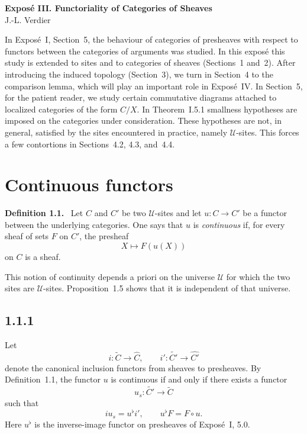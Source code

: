 \documentclass[11pt]{article}
\newcommand{\U}{\mathcal{U}}
\newenvironment{statement}[1]{\par\medskip\noindent\textbf{#1.}\ }{\par\medskip}
\begin{document}
\begin{center}
{\Large \textbf{Expos\'e III. Functoriality of Categories of Sheaves}}\\[0.35em]
J.-L. Verdier
\end{center}

\bigskip


\bigskip

In Expos\'e~I, Section~5, the behaviour of categories of presheaves with respect to functors between the categories of arguments was studied. In this expos\'e this study is extended to sites and to categories of sheaves (Sections~1 and~2). After introducing the induced topology (Section~3), we turn in Section~4 to the comparison lemma, which will play an important role in Expos\'e~IV. In Section~5, for the patient reader, we study certain commutative diagrams attached to localized categories of the form \(C/X\). In Theorem~I.5.1 smallness hypotheses are imposed on the categories under consideration. These hypotheses are not, in general, satisfied by the sites encountered in practice, namely \(\U\)-sites. This forces a few contortions in Sections~4.2, 4.3, and~4.4.

\section{Continuous functors}

\begin{statement}{Definition 1.1}
Let \(C\) and \(C'\) be two \(\U\)-sites and let
\(u:C\to C'\) be a functor between the underlying categories. One says that \(u\) is \emph{continuous} if, for every sheaf of sets \(F\) on \(C'\), the presheaf
\[
X\longmapsto F(u(X))
\]
on \(C\) is a sheaf.
\end{statement}

This notion of continuity depends a priori on the universe \(\U\) for which the two sites are \(\U\)-sites. Proposition~1.5 shows that it is independent of that universe.

\subsection*{1.1.1}
Let
\[
i:\widetilde C\to \widehat C,
\qquad
 i':\widetilde{C'}\to \widehat{C'}
\]
denote the canonical inclusion functors from sheaves to presheaves. By Definition~1.1, the functor \(u\) is continuous if and only if there exists a functor
\[
u_s:\widetilde{C'}\to\widetilde C
\]
such that
\[
i u_s=u^\flat i',\qquad u^\flat F=F\circ u.
\]
Here \(u^\flat\) is the inverse-image functor on presheaves of Expos\'e~I, 5.0.
\end{document}

